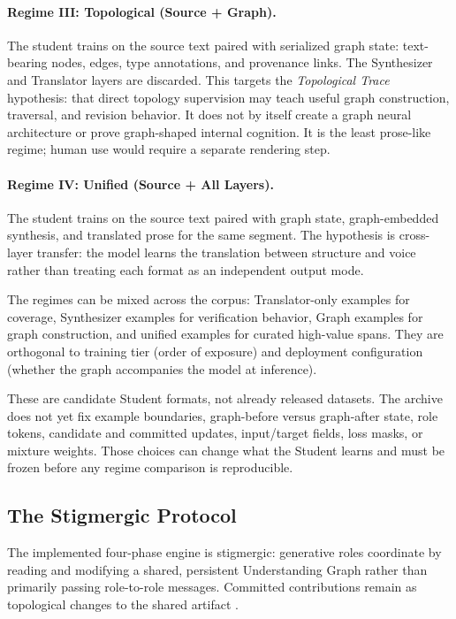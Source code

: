 \paragraph{Regime III: Topological (Source + Graph).} The student trains on the
source text paired with serialized graph state: text-bearing nodes, edges, type
annotations, and provenance links. The Synthesizer and Translator layers are
discarded. This targets the \emph{Topological Trace}
hypothesis\label{sec:topological-mind}: that direct topology supervision may
teach useful graph construction, traversal, and revision behavior. It does not
by itself create a graph neural architecture or prove graph-shaped internal
cognition. It is the least prose-like regime; human use would require a
separate rendering step.

\paragraph{Regime IV: Unified (Source + All Layers).} The student trains on the
source text paired with graph state, graph-embedded synthesis, and translated
prose for the same segment. The hypothesis is cross-layer transfer: the model
learns the translation between structure and voice rather than treating each
format as an independent output mode.

The regimes can be mixed across the corpus: Translator-only examples for
coverage, Synthesizer examples for verification behavior, Graph examples for
graph construction, and unified examples for curated high-value spans. They
are orthogonal to training tier (order of exposure) and deployment
configuration (whether the graph accompanies the model at inference).

These are candidate Student formats, not already released datasets. The
archive does not yet fix example boundaries, graph-before versus graph-after
state, role tokens, candidate and committed updates, input/target fields, loss
masks, or mixture weights. Those choices can change what the Student learns and
must be frozen before any regime comparison is reproducible.


\subsection{The Stigmergic Protocol}\label{sec:architectural_validation}

The implemented four-phase engine is stigmergic: generative roles coordinate by
reading and modifying a shared, persistent Understanding Graph rather than
primarily passing role-to-role messages. Committed contributions remain as
topological changes to the shared artifact
\cite{westerberg2026understanding}.

